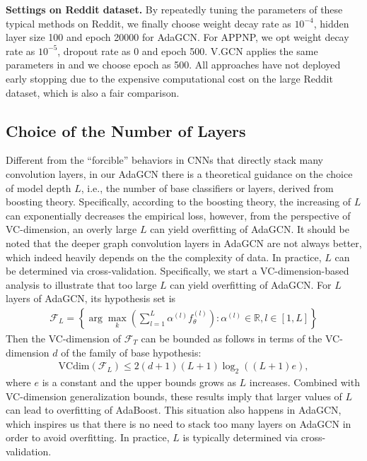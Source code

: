 \documentclass{article} \usepackage{iclr2021_conference,times}
\begin{document}
\textbf{Settings on Reddit dataset.} By repeatedly tuning the parameters of these typical methods on Reddit, we finally choose weight decay rate as $10^{-4}$, hidden layer size 100 and epoch 20000 for AdaGCN. For APPNP, we opt weight decay rate as $10^{-5}$, dropout rate as 0 and epoch 500. V.GCN applies the same parameters in \citep{kipf2016semi} and we choose epoch as 500. All approaches have not deployed early stopping due to the expensive computational cost on the large Reddit dataset, which is also a fair comparison.

\subsection{Choice of the Number of Layers} \label{sec:vc_dimension}
Different from the ``forcible'' behaviors in CNNs that directly stack many convolution layers, in our AdaGCN there is a theoretical guidance on the choice of model depth $L$, i.e., the number of base classifiers or layers, derived from boosting theory. Specifically, according to the boosting theory, the increasing of $L$ can exponentially decreases the empirical loss, however, from the perspective of VC-dimension, an overly large $L$ can yield overfitting of AdaGCN. It should be noted that the deeper graph convolution layers in AdaGCN are not always better, which indeed heavily depends on the the complexity of data. In practice, $L$ can be determined via cross-validation. Specifically, we start a VC-dimension-based analysis to illustrate that too large $L$ can yield overfitting of AdaGCN. For $L$ layers of AdaGCN, its hypothesis set is
\begin{equation} 
\label{eq_set}
\begin{aligned} 
\mathcal{F}_{L}=\left\{\arg\max_k \left(\sum_{l=1}^{L} \alpha^{(l)} f_{\theta}^{(l)} \right) : \alpha^{(l)} \in \mathbb{R}, l \in[1, L]\right\}
\end{aligned} 
\end{equation}
Then the VC-dimension of $\mathcal{F}_T$ can be bounded as follows in terms of the VC-dimension $d$ of the family of base hypothesis:
\begin{equation} 
\label{eq_VC}
\begin{aligned} 
\text{VCdim}\left(\mathcal{F}_{L}\right) \leq 2(d+1)(L+1) \log _{2}((L+1) e),
\end{aligned} 
\end{equation}
where $e$ is a constant and the upper bounds grows as $L$ increases. Combined with VC-dimension generalization bounds, these results imply that larger values of $L$ can lead to overfitting of AdaBoost. This situation also happens in AdaGCN, which inspires us that there is no need to stack too many layers on AdaGCN in order to avoid overfitting. In practice, $L$ is typically determined via cross-validation.
\end{document}
